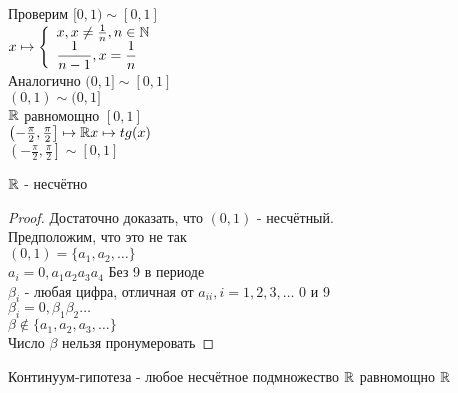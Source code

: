 Проверим $ [0, 1) \sim [0,1] $ \\
$ x \mapsto \left\{ \begin{array}{ll} x, x \neq \frac{1}{n}, n \in \mathbb{N} \\ \dfrac{1}{n-1}, x = \dfrac{1}{n} \end{array} \right. $\\
Аналогично $ (0, 1] \sim [0,1] $\\
$ (0, 1) \sim (0,1] $\\
$\mathbb{R}$ равномощно $ [0, 1] $ \\
$ \left( -\frac{\pi}{2}, \frac{\pi}{2} \right] \mapsto \mathbb{R} \\
x \mapsto tg(x) $\\
$ \left( -\frac{\pi}{2}, \frac{\pi}{2} \right]  \sim [0, 1] $ \\
\begin{theorem}
	$\mathbb{R}$ - несчётно \\
	\begin{proof}
		Достаточно доказать, что $ (0, 1) $ - несчётный.\\
		Предположим, что это не так\\
		$ (0, 1) = \{ a_1, a_2, \dots \} $ \\
		$ a_i = 0,a_1a_2a_3a_4 $ Без 9 в периоде \\
		$ \beta_i $ - любая цифра, отличная от $ a_{ii}, i=1,2,3,\dots$ 0 и 9\\
		$ \beta_i = 0,\beta_1\beta_2\dots$\\
		$\beta \notin \{ a_1, a_2, a_3, \dots \} $\\
		Число $ \beta$ нельзя пронумеровать 
	\end{proof}
\end{theorem}

Континуум-гипотеза - любое несчётное подмножество  $\mathbb{R}$  равномощно $\mathbb{R}$ \\




